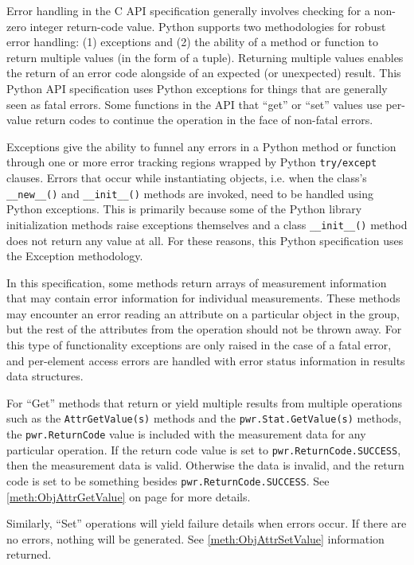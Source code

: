 \documentclass[12pt]{report} %
\begin{document}
\begin{appendices}
Error handling in the C API specification generally involves checking for a
non-zero integer return-code value. Python supports two methodologies for
robust error handling: (1) exceptions and (2) the ability of a method or
function to return multiple values (in the form of a tuple). Returning multiple
values enables the return of an error code alongside of an expected (or
unexpected) result. This Python API specification uses Python exceptions for
things that are generally seen as fatal errors. Some functions in the API that
``get'' or ``set'' values use per-value return codes to continue the operation
in the face of non-fatal errors.

Exceptions give the ability to funnel any errors in a Python method or function
through one or more error tracking regions wrapped by Python
\texttt{try/except} clauses. Errors that occur while instantiating objects,
i.e. when the class's \texttt{__new__()} and \texttt{__init__()} methods are
invoked, need to be handled using Python exceptions. This is primarily because
some of the Python library initialization methods raise exceptions themselves
and a class \texttt{__init__()} method does not return any value at all. For
these reasons, this Python specification uses the Exception methodology.

In this specification, some methods return arrays of measurement information
that may contain error information for individual measurements. These methods
may encounter an error reading an attribute on a particular object in the
group, but the rest of the attributes from the operation should not be thrown
away. For this type of functionality exceptions are only raised in the case of
a fatal error, and per-element access errors are handled with error status
information in results data structures.

For ``Get'' methods that return or yield multiple results from multiple
operations such as the \texttt{AttrGetValue(s)} methods and the
\texttt{pwr.Stat.GetValue(s)} methods, the \texttt{pwr.ReturnCode} value is
included with the measurement data for any particular operation. If the return
code value is set to \texttt{pwr.ReturnCode.SUCCESS}, then the measurement data
is valid. Otherwise the data is invalid, and the return code is set to be
something besides \texttt{pwr.ReturnCode.SUCCESS}. See
\ref{meth:ObjAttrGetValue} on page \pageref{meth:ObjAttrGetValue} for more
details.

Similarly, ``Set'' operations will yield failure details when errors occur.  If
there are no errors, nothing will be generated.  See \ref{meth:ObjAttrSetValue}
information returned.


\end{appendices}
\end{document}

